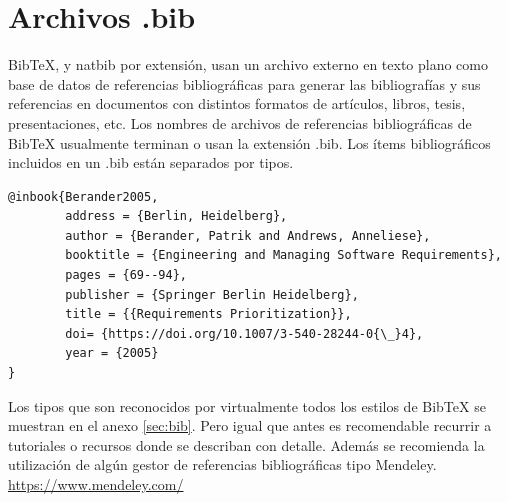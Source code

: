 \section{Archivos .bib}

 BibTeX, y natbib por extensión, usan un archivo externo en texto plano como base de datos de referencias bibliográficas para generar las bibliografías y sus referencias en documentos con distintos formatos de artículos, libros, tesis, presentaciones, etc. Los nombres de archivos de referencias bibliográficas de BibTeX usualmente terminan o usan la extensión .bib. Los ítems bibliográficos incluidos en un .bib están separados por tipos.

 \begin{verbatim}
@inbook{Berander2005,
        address = {Berlin, Heidelberg},
        author = {Berander, Patrik and Andrews, Anneliese},
        booktitle = {Engineering and Managing Software Requirements},
        pages = {69--94},
        publisher = {Springer Berlin Heidelberg},
        title = {{Requirements Prioritization}},
        doi= {https://doi.org/10.1007/3-540-28244-0{\_}4},
        year = {2005}
}
 \end{verbatim}

 Los tipos que son reconocidos por virtualmente todos los estilos de BibTeX se muestran en el anexo \ref{sec:bib}. Pero igual que antes es recomendable recurrir a tutoriales o recursos donde se describan con detalle. Además se recomienda la utilización de algún gestor de referencias bibliográficas tipo Mendeley. \url{https://www.mendeley.com/}
